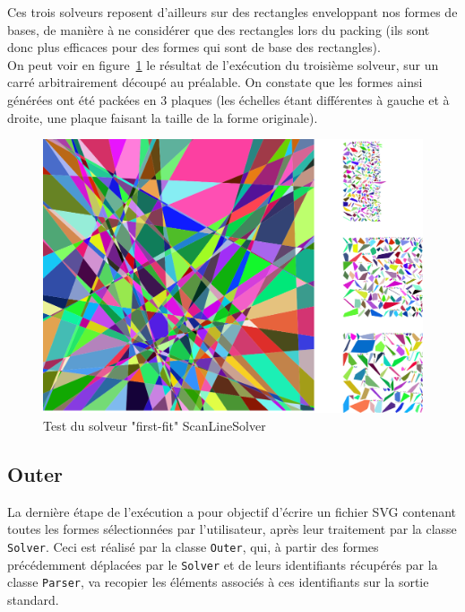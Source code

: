 Ces trois solveurs reposent d'ailleurs sur des rectangles enveloppant nos formes de bases, de manière à ne considérer que des rectangles lors du packing (ils sont donc plus efficaces pour des formes qui sont de base des rectangles).\\

On peut voir en figure~\ref{la banane} le résultat de l'exécution du troisième solveur, sur un carré arbitrairement découpé au préalable. On constate que les formes ainsi générées ont été packées en 3 plaques (les échelles étant différentes à gauche et à droite, une plaque faisant la taille de la forme originale).

\begin{figure}[htb!]
\center
\includegraphics[scale=0.4]{img/scanLineTest}
\caption{Test du solveur "first-fit" ScanLineSolver}
\label{la banane}
\end{figure}



\newpage
\subsection{Outer}

La dernière étape de l'exécution a pour objectif d'écrire un fichier SVG contenant toutes les formes sélectionnées par l'utilisateur, après leur traitement par la classe \texttt{Solver}. Ceci est réalisé par la classe \texttt{Outer}, qui, à partir des formes précédemment déplacées par le \texttt{Solver} et de leurs identifiants récupérés par la classe \texttt{Parser}, va recopier les éléments associés à ces identifiants sur la sortie standard.\\


